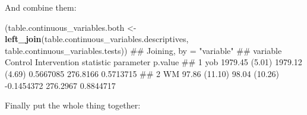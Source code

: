\documentclass[]{article}
\newenvironment{Shaded}{\begin{snugshade}}{\end{snugshade}}
\newcommand{\KeywordTok}[1]{\textcolor[rgb]{0.13,0.29,0.53}{\textbf{#1}}}
\newcommand{\StringTok}[1]{\textcolor[rgb]{0.31,0.60,0.02}{#1}}
\newcommand{\NormalTok}[1]{#1}
\theoremstyle{definition}
\theoremstyle{definition}
\theoremstyle{definition}
\theoremstyle{remark}
\begin{document}
And combine them:

\begin{Shaded}
\begin{Highlighting}[]
\NormalTok{(table.continuous_variables.both <-}\StringTok{ }
\StringTok{  }\KeywordTok{left_join}\NormalTok{(table.continuous_variables.descriptives, }
\NormalTok{            table.continuous_variables.tests))}
\NormalTok{## Joining, by = "variable"}
\NormalTok{##   variable        Control   Intervention  statistic parameter   p.value}
\NormalTok{## 1      yob 1979.45 (5.01) 1979.12 (4.69)  0.5667085  276.8166 0.5713715}
\NormalTok{## 2       WM  97.86 (11.10)  98.04 (10.26) -0.1454372  276.2967 0.8844717}
\end{Highlighting}
\end{Shaded}

Finally put the whole thing together:
\end{document}
